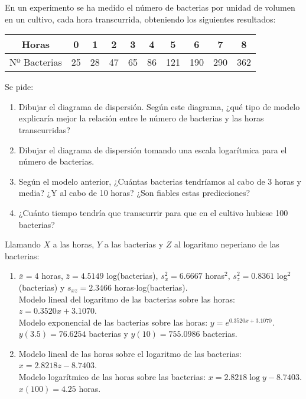 {En un experimento se ha medido el número de bacterias por unidad de volumen en un cultivo, cada hora transcurrida,
obteniendo los siguientes resultados: 
\begin{center}
\begin{tabular}{c|ccccccccc}
Horas & 0 & 1 & 2 & 3 & 4 & 5 & 6 & 7 & 8  \\
\hline
Nº Bacterias & 25 & 28 & 47 & 65 & 86 & 121 & 190 & 290 & 362
\end{tabular}
\end{center}

Se pide:
\begin{enumerate}
\item Dibujar el diagrama de dispersión.
Según este diagrama, ¿qué tipo de modelo explicaría mejor la relación entre le número de bacterias y las horas
transcurridas?
\item Dibujar el diagrama de dispersión tomando una escala logarítmica para el número de bacterias.
\item Según el modelo anterior, ¿Cuántas bacterias tendríamos al cabo de 3 horas y media?
¿Y al cabo de 10 horas?
¿Son fiables estas predicciones?
\item ¿Cuánto tiempo tendría que transcurrir para que en el cultivo hubiese 100 bacterias?
\end{enumerate}
}
{Llamando $X$ a las horas, $Y$ a las bacterias y $Z$ al logaritmo neperiano de las bacterias:
\begin{enumerate}[start=3]
\item $\bar x=4$ horas, $\bar z=4.5149$ log(bacterias), $s_x^2=6.6667$ horas$^2$, $s_z^2=0.8361$ log$^2$(bacterias) y
$s_{xz}=2.3466$ horas$\cdot$log(bacterias).\\
Modelo lineal del logaritmo de las bacterias sobre las horas: $z=0.3520x+3.1070$.\\
Modelo exponencial de las bacterias sobre las horas: $y=e^{0.3520x+3.1070}$.\\
$y(3.5)=76.6254$ bacterias y $y(10)=755.0986$ bacterias.
\item Modelo lineal de las horas sobre el logaritmo de las bacterias: $x=2.8218z-8.7403$.\\
Modelo logarítmico de las horas sobre las bacterias: $x=2.8218\log y-8.7403$.\\
$x(100)=4.25$ horas.
\end{enumerate}
}
{}


